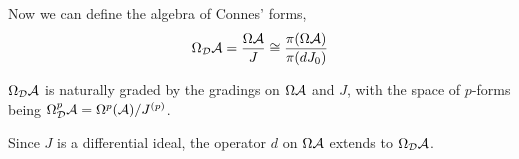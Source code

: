 \documentclass{owmaths}
\begin{document}
Now we can define the algebra of Connes' forms,
\begin{equation*}
    \Omega_{\mathcal{D}}\mathcal{A} = \frac{\Omega \mathcal{A}}{J} \cong \frac{\pi(\Omega \mathcal{A})}{\pi(dJ_0)}
\end{equation*}

$\Omega_{\mathcal{D}} \mathcal{A}$ is naturally graded by the gradings on $\Omega \mathcal{A}$ and $J$, with the 
space of $p$-forms being $\Omega^p_{\mathcal{D}} \mathcal{A} = \Omega^p(\mathcal{A})/J^{(p)}$.

Since $J$ is a differential ideal, the operator $d$ on $\Omega \mathcal{A}$
extends to $\Omega_{\mathcal{D}} \mathcal{A}$. 
\end{document}
